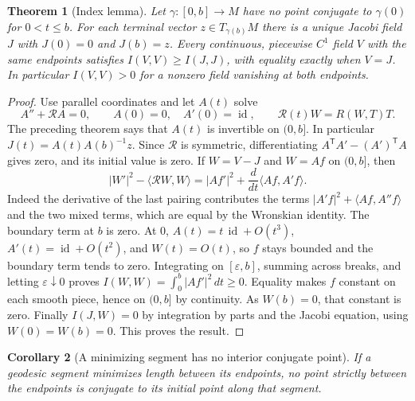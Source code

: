 \documentclass[11pt,oneside,openany]{book}
\theoremstyle{plain}
\newtheorem{theorem}{Theorem}[chapter]
\newtheorem{corollary}[theorem]{Corollary}
\theoremstyle{definition}
\theoremstyle{remark}
\begin{document}
\begin{theorem}[Index lemma]\label{thm:p202-index-lemma}
Let \(\gamma:[0,b]\to M\) have no point conjugate to
\(\gamma(0)\) for \(0<t\le b\). For each terminal vector
\(z\in T_{\gamma(b)}M\) there is a unique Jacobi field \(J\)
with \(J(0)=0\) and \(J(b)=z\). Every continuous, piecewise
\(C^1\) field \(V\) with the same endpoints satisfies
\(I(V,V)\ge I(J,J)\), with equality exactly when \(V=J\).
In particular \(I(V,V)>0\) for a nonzero field vanishing at
both endpoints.
\end{theorem}

\begin{proof}
Use parallel coordinates and let \(A(t)\) solve
\[
 A''+\mathcal R A=0,\qquad A(0)=0,\quad A'(0)=\operatorname{id},
 \qquad \mathcal R(t)W=R(W,T)T.
\]
The preceding theorem says that \(A(t)\) is invertible on
\((0,b]\). In particular \(J(t)=A(t)A(b)^{-1}z\).
Since \(\mathcal R\) is symmetric, differentiating
\(A^{\mathsf T}A'-(A')^{\mathsf T}A\) gives zero, and its
initial value is zero. If \(W=V-J\) and \(W=A f\) on \((0,b]\),
then
\[
 |W'|^2-\langle\mathcal R W,W\rangle
 =|Af'|^2+\frac{d}{dt}\langle Af,A'f\rangle .
\]
Indeed the derivative of the last pairing contributes the
terms \(|A'f|^2+\langle Af,A''f\rangle\) and the two mixed
terms, which are equal by the Wronskian identity. The boundary
term at \(b\) is zero. At \(0\), \(A(t)=t\,\operatorname{id}
+O(t^3)\), \(A'(t)=\operatorname{id}+O(t^2)\), and \(W(t)=O(t)\),
so \(f\) stays bounded and the boundary term tends to zero.
Integrating on \([\varepsilon,b]\), summing across breaks,
and letting \(\varepsilon\downarrow0\) proves
\(I(W,W)=\int_0^b|Af'|^2\,dt\ge0\).
Equality makes \(f\) constant on each smooth piece, hence on
\((0,b]\) by continuity. As \(W(b)=0\), that constant is zero.
Finally \(I(J,W)=0\) by integration by parts and the Jacobi
equation, using \(W(0)=W(b)=0\). This proves the result.
\end{proof}

\begin{corollary}[A minimizing segment has no interior conjugate point]
\label{cor:p202-no-interior-conjugate}
If a geodesic segment minimizes length between its endpoints,
no point strictly between the endpoints is conjugate to its
initial point along that segment.
\end{corollary}
\end{document}
